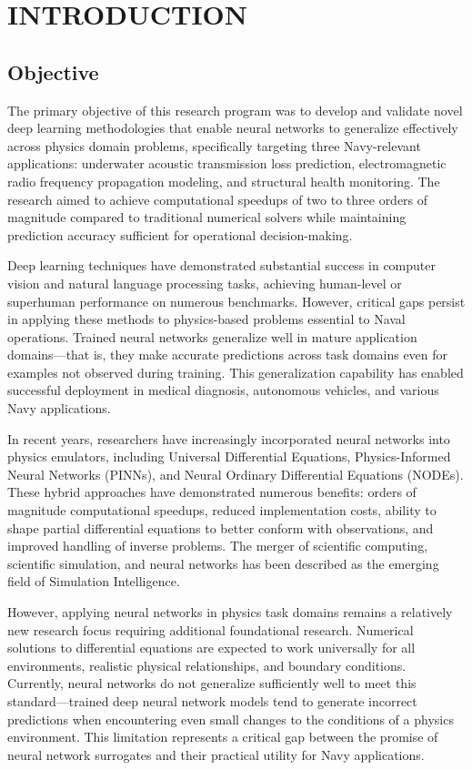 \documentclass{article}
\begin{document}
\tableofcontents
\newpage

\section{INTRODUCTION}

\subsection{Objective}

The primary objective of this research program was to develop and validate novel deep learning methodologies that enable neural networks to generalize effectively across physics domain problems, specifically targeting three Navy-relevant applications: underwater acoustic transmission loss prediction, electromagnetic radio frequency propagation modeling, and structural health monitoring. The research aimed to achieve computational speedups of two to three orders of magnitude compared to traditional numerical solvers while maintaining prediction accuracy sufficient for operational decision-making.

Deep learning techniques have demonstrated substantial success in computer vision and natural language processing tasks, achieving human-level or superhuman performance on numerous benchmarks. However, critical gaps persist in applying these methods to physics-based problems essential to Naval operations. Trained neural networks generalize well in mature application domains—that is, they make accurate predictions across task domains even for examples not observed during training. This generalization capability has enabled successful deployment in medical diagnosis, autonomous vehicles, and various Navy applications.

In recent years, researchers have increasingly incorporated neural networks into physics emulators, including Universal Differential Equations, Physics-Informed Neural Networks (PINNs), and Neural Ordinary Differential Equations (NODEs). These hybrid approaches have demonstrated numerous benefits: orders of magnitude computational speedups, reduced implementation costs, ability to shape partial differential equations to better conform with observations, and improved handling of inverse problems. The merger of scientific computing, scientific simulation, and neural networks has been described as the emerging field of Simulation Intelligence.

However, applying neural networks in physics task domains remains a relatively new research focus requiring additional foundational research. Numerical solutions to differential equations are expected to work universally for all environments, realistic physical relationships, and boundary conditions. Currently, neural networks do not generalize sufficiently well to meet this standard—trained deep neural network models tend to generate incorrect predictions when encountering even small changes to the conditions of a physics environment. This limitation represents a critical gap between the promise of neural network surrogates and their practical utility for Navy applications.
\end{document}
